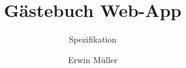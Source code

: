 \newcommand{\AppName}{Gästebuch}
\newcommand{\TheEmail}{\url{erwin.mueller@deventm.de}}
\newcommand{\TheCurrentRevisionDate}{\TheRevisionOneDate}
\newcommand{\TheCurrentRevision}{\TheRevisionOne}
\newcommand{\TheCurrentDate}{\TheCurrentRevisionDate}
\newcommand{\TheAuthor}{Erwin Müller}
\newcommand{\TheLogo}{docu-logo}
%
\title{Gästebuch Web-App}
\subtitle{Spezifikation}
\author{\TheAuthor}
\date{\TheCurrentRevision\\\TheCurrentDate}

\lowertitleback{%
\textcopyright{} 2016 \TheAuthor,\\\TheEmail{}\\All rights reserved}

\newcommand{\TheRevisionOne}{Revision 1}
\newcommand{\TheRevisionOneDate}{}
%
\uppertitleback{
\TheRevisionOne{} \TheRevisionOneDate\\
}
